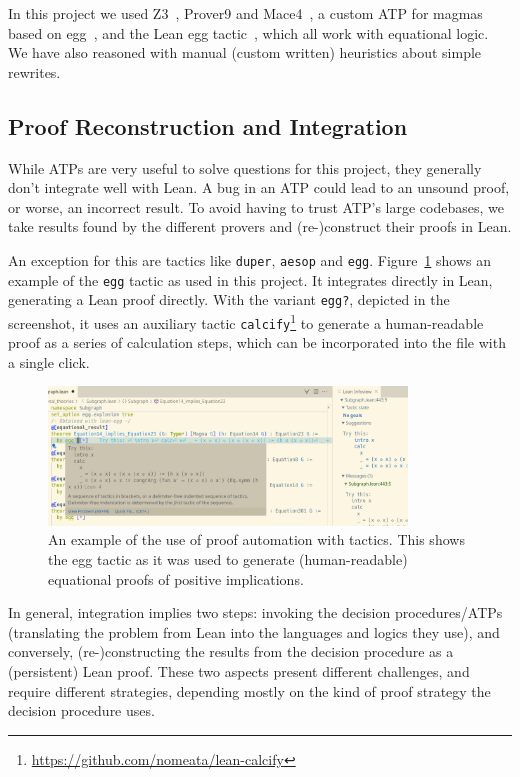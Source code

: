 In this project we used Z3~\cite{DBLP:conf/tacas/MouraB08}, Prover9 and Mace4~\cite{prover9-mace4}, a custom ATP for magmas based on egg~\cite{DBLP:journals/pacmpl/WillseyNWFTP21}, and the Lean egg tactic~\cite{DBLP:journals/pacmpl/KoehlerGBGTS24,rossel2024bridging}, which all work with equational logic. We have also reasoned with manual (custom written) heuristics about simple rewrites.

\subsection{Proof Reconstruction and Integration}
\label{sec:proof-reconstruction}

While ATPs are very useful to solve questions for this project, they generally don't integrate well with Lean.
A bug in an ATP could lead to an unsound proof, or worse, an incorrect result.
To avoid having to trust ATP's large codebases, we take results found by the different provers and (re-)construct their proofs in Lean.

An exception for this are tactics like \texttt{duper}, \texttt{aesop} and \texttt{egg}. Figure~\ref{fig:screenshot-egg} shows an example of the \texttt{egg} tactic as used in this project. It integrates directly in Lean, generating a Lean proof directly. With the variant \texttt{egg?}, depicted in the screenshot, it uses an auxiliary tactic \texttt{calcify}\footnote{\url{https://github.com/nomeata/lean-calcify}} to generate a human-readable proof as a series of calculation steps, which can be incorporated into the file with a single click.

\begin{figure}
  \centering
  \includegraphics[width=0.85\textwidth]{screenshot-egg.png}
  \caption{An example of the use of proof automation with tactics. This shows the egg tactic as it was used to generate (human-readable) equational proofs of positive implications.}
  \label{fig:screenshot-egg}
\end{figure}

In general, integration implies two steps: invoking the decision procedures/ATPs (translating the problem from Lean into the languages and logics they use), and conversely, (re-)constructing the results from the decision procedure as a (persistent) Lean proof.
These two aspects present different challenges, and require different strategies, depending mostly on the kind of proof strategy the decision procedure uses.

